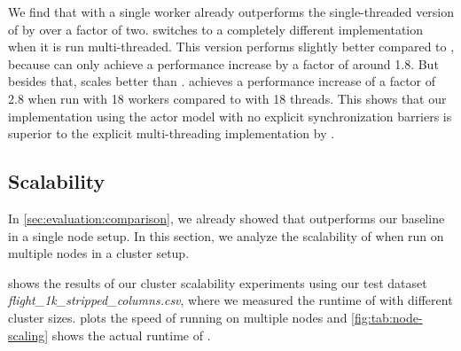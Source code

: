   We find that \dodo{} with a single worker already outperforms the single-threaded version of \ocddiscover{} by over a factor of two.
  \ocddiscover{} switches to a completely different implementation when it is run multi-threaded.
  This version performs slightly better compared to \dodo{}, because \dodo{} can only achieve a performance increase by a factor of around 1.8.
  But besides that, \dodo{} scales better than \ocddiscover{}.
  \dodo{} achieves a performance increase of a factor of 2.8 when run with 18 workers compared to \ocddiscover{} with 18 threads.
  This shows that our implementation using the actor model with no explicit synchronization barriers is superior to the explicit multi-threading implementation by \citeauthor{consonni}.

\subsection{Scalability}\label{sec:evaluation:scalability}

  In \cref{sec:evaluation:comparison}, we already showed that \dodo{} outperforms our baseline \ocddiscover{} in a single node setup.
  In this section, we analyze the scalability of \dodo{} when run on multiple nodes in a cluster setup.

   shows the results of our cluster scalability experiments using our test dataset \textit{flight\_1k\_stripped\_columns.csv}, where we measured the runtime of \dodo{} with different cluster sizes.
   plots the speed of running \dodo{} on multiple nodes and \cref{fig:tab:node-scaling} shows the actual runtime of \dodo{}.

